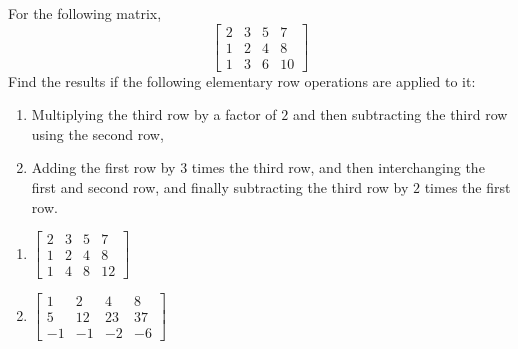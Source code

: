 \begin{Exercise}
For the following matrix,
\[
\begin{bmatrix}
2 & 3 & 5 & 7\\
1 & 2 & 4 & 8\\
1 & 3 & 6 & 10
\end{bmatrix}
\]
Find the results if the following elementary row operations are applied to it: 
\begin{enumerate}[label=(\alph*)]
\item Multiplying the third row by a factor of $2$ and then subtracting the third row using the second row,
\item Adding the first row by $3$ times the third row, and then interchanging the first and second row, and finally subtracting the third row by $2$ times the first row.
\end{enumerate}
\end{Exercise}
\begin{Answer}
\begin{enumerate}[label=(\alph*)]
\item $\begin{bmatrix}
2 & 3 & 5 & 7 \\
1 & 2 & 4 & 8 \\
1 & 4 & 8 & 12
\end{bmatrix}$
\item $\begin{bmatrix}
1 & 2 & 4 & 8 \\
5 & 12 & 23 & 37 \\
-1 & -1 & -2 & -6
\end{bmatrix}$
\end{enumerate}
\end{Answer}

